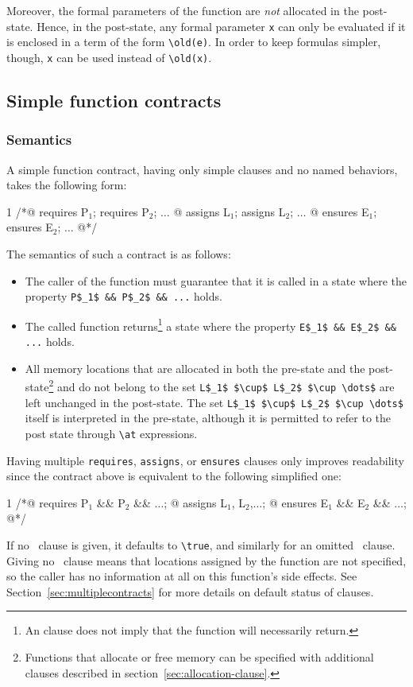 Moreover, the formal parameters of the function are \emph{not} allocated in the post-state.
Hence, in the post-state, any formal parameter \lstinline|x| can
only be evaluated if it is enclosed in a term of the form \lstinline|\old(e)|.
In order to keep formulas simpler, though, \lstinline|x| can be used instead of
\lstinline|\old(x)|.

\subsection{Simple function contracts}
\label{sec:simplecontracts}
\subsubsection{Semantics}\label{sec:simple-contracts-definition}
A simple function contract, having only simple clauses and no named behaviors, takes the following
form:
\begin{listing}{1}
/*@ requires P$_1$; requires P$_2$; $\dots$
  @ assigns L$_1$;  assigns L$_2$;  $\dots$
  @ ensures E$_1$;  ensures E$_2$;  $\dots$
  @*/
\end{listing}
The semantics of such a contract is as follows:
\begin{itemize}
\item The caller of the function must guarantee that it is called in a
  state where the property \lstinline|P$_1$ && P$_2$ && ...| holds.
\item The called function returns\footnote{An \ensures{} clause does not
  imply that the function will necessarily return.} a state where the property
  \lstinline|E$_1$ && E$_2$ && ...| holds.
\item All memory locations that are allocated in both the pre-state and
  the post-state\footnote{Functions that allocate or free memory can be
    specified with additional clauses described in
    section~\ref{sec:allocation-clause}.}
  and do not belong to the
  set \lstinline|L$_1$ $\cup$ L$_2$ $\cup \dots$| are left unchanged in the
  post-state. The set \lstinline|L$_1$ $\cup$ L$_2$ $\cup \dots$|
  itself is interpreted in the pre-state, although it is permitted to
  refer to the post state through \lstinline|\at| expressions.
\end{itemize}

Having multiple \lstinline|requires|, \lstinline|assigns|, or
\lstinline|ensures| clauses only improves
readability since the contract above is equivalent to the following
simplified one:
\begin{listing}{1}
/*@ requires P$_1$ && P$_2$ && $\dots$;
  @ assigns L$_1$, L$_2$,$\dots$;
  @ ensures E$_1$ && E$_2$ && $\dots$;
  @*/
\end{listing}
If no \requires\ clause is given, it defaults to
\lstinline!\true!, and similarly for an omitted \ensures\ clause.
Giving no \assigns\ clause
means that locations assigned by the function are not specified, so
the caller has no information at all on this function's side
effects. See Section~\ref{sec:multiplecontracts} for more details on
default status of clauses.


